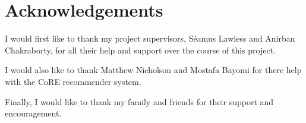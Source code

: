 \chapter*{\Huge{Acknowledgements}}

I would first like to thank my project supervisors, Séamus Lawless and Anirban Chakraborty, for all their help and support over the course of this project. 

I would also like to thank Matthew Nicholson and Mostafa Bayomi for there help with the CoRE recommender system.

Finally, I would like to thank my family and friends for their support and encouragement.